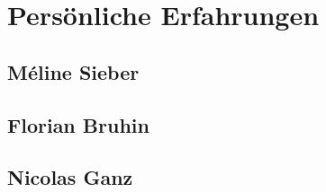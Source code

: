 \documentclass[a4paper]{article}
\let\oldsection\section
\renewcommand\section{\clearpage\oldsection}
\begin{document}
  \section{Persönliche Erfahrungen}

  \subsection{Méline Sieber}


  \subsection{Florian Bruhin}


  \subsection{Nicolas Ganz}

\end{document}
